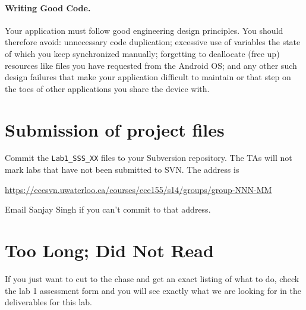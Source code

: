 \documentclass[10pt]{article}
\newcommand{\todo}[1]{{\red\textbf{TODO: }#1}\xspace}
\begin{document}
\paragraph{Writing Good Code.} Your application must follow good engineering design principles. You should therefore avoid: unnecessary code duplication; excessive use of variables the state of which you keep synchronized manually; forgetting to deallocate (free up) resources like files you have requested from the Android OS; and any other such design failures that make your application difficult to maintain or that step on the toes of other applications you share the device with.

\section{Submission of project files}
Commit the {\tt Lab1\_SSS\_XX} files to your Subversion repository. The TAs will not mark labs that have not been submitted to SVN. The address is

\url{https://ecesvn.uwaterloo.ca/courses/ece155/s14/groups/group-NNN-MM}

Email Sanjay Singh if you can't commit to that address.


\section{Too Long; Did Not Read}
If you just want to cut to the chase and get an exact listing of what to do, check the lab 1 assessment form and you will see exactly what we are looking for in the deliverables for this lab.
\end{document}
